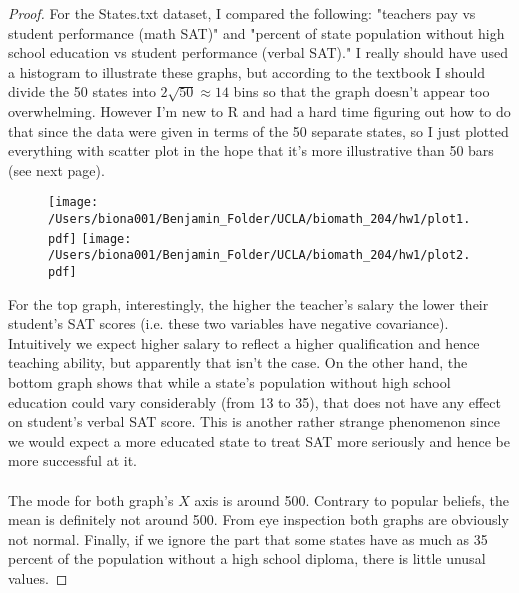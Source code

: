 \documentclass[12pt]{article}
\begin{document}
\begin{proof}
For the States.txt dataset, I compared the following: "teachers pay vs student performance (math SAT)" and "percent of state population without high school education vs student performance (verbal SAT)." I really should have used a histogram to illustrate these graphs, but according to the textbook I should divide the 50 states into $2\sqrt{50} \approx 14$ bins so that the graph doesn't appear too overwhelming. However I'm new to R and had a hard time figuring out how to do that since the data were given in terms of the 50 separate states, so I just plotted everything with scatter plot in the hope that it's more illustrative than 50 bars (see next page).\\

\begin{figure}[!tbp]
  \centering
{\texttt{[image: /Users/biona001/Benjamin\_Folder/UCLA/biomath\_204/hw1/plot1.pdf]}\label{fig:f1}}
  \hfill
{\texttt{[image: /Users/biona001/Benjamin\_Folder/UCLA/biomath\_204/hw1/plot2.pdf]}\label{fig:f2}}
\end{figure}

For the top graph, interestingly, the higher the teacher's salary the lower their student's SAT scores (i.e. these two variables have negative covariance). Intuitively we expect higher salary to reflect a higher qualification and hence teaching ability, but apparently that isn't the case. On the other hand, the bottom graph shows that while a state's population without high school education could vary considerably (from 13 to 35), that does not have any effect on student's verbal SAT score. This is another rather strange phenomenon since we would expect a more educated state to treat SAT more seriously and hence be more successful at it. \\
\\
The mode for both graph's $X$ axis is around 500. Contrary to popular beliefs, the mean is definitely not around 500. From eye inspection both graphs are obviously not normal. Finally, if we ignore the part that some states have as much as 35 percent of the population without a high school diploma, there is little unusal values. 
\end{proof}
\end{document}
